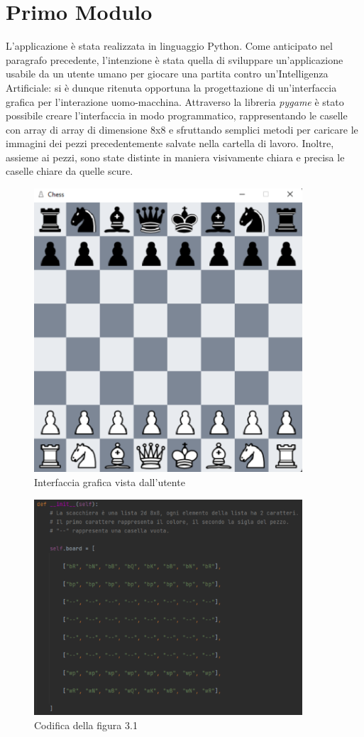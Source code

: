 \section{Primo Modulo}
L'applicazione è stata realizzata in linguaggio Python. Come anticipato nel paragrafo precedente, l'intenzione è stata quella di sviluppare un'applicazione usabile da un utente umano per giocare una partita contro un'Intelligenza Artificiale: si è dunque ritenuta opportuna la progettazione di un'interfaccia grafica per l'interazione uomo-macchina. Attraverso la libreria \textit{pygame} è stato possibile creare l'interfaccia in modo programmatico, rappresentando le caselle con array di array di dimensione 8x8 e sfruttando semplici metodi per caricare le immagini dei pezzi precedentemente salvate nella cartella di lavoro. Inoltre, assieme ai pezzi, sono state distinte in maniera visivamente chiara e precisa le caselle chiare da quelle scure. 
\begin{figure}[!htb]
    \includegraphics[width=10cm]{frontmatter/figure/scacchiera_gui.pdf}
    \centering
    \caption{Interfaccia grafica vista dall'utente}
    \label{fig:scacchiera_gui}
\end{figure}
\begin{figure}[!htb]
    \includegraphics[width=10cm]{frontmatter/figure/rappresentazione_scacchiera.pdf}
    \centering
    \caption{Codifica della figura 3.1}
    \label{fig:rappresentazione_scacchiera}
\end{figure}
